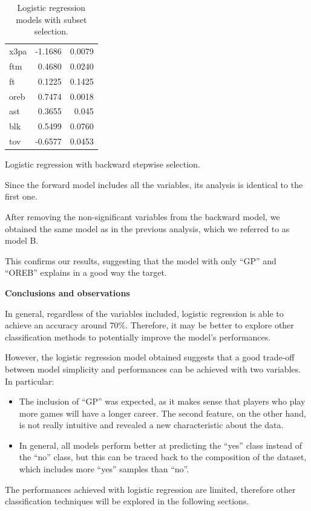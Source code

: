 \begin{table}[H]
\begin{subtable}[h]{0.4\textwidth}
\begin{tabular}{|| l | r | r ||}
			x3pa & -1.1686 & 0.0079 \\
			ftm & 0.4680 & 0.0240 \\
			ft & 0.1225 & 0.1425 \\
			oreb & 0.7474 & 0.0018 \\
			ast & 0.3655 & 0.045 \\
			blk & 0.5499 & 0.0760 \\				
			tov & -0.6577 & 0.0453 \\
			\hline
		\end{tabular}
		\caption{Logistic regression with backward stepwise selection.}
		\label{table:LRBSSum}
	\end{subtable}
	\caption{Logistic regression models with subset selection.}
	\label{table:LRSSum}
\end{table}

Since the forward model includes all the variables, its analysis is identical to the first one.

After removing the non-significant variables from the backward model, we obtained the same model as in the previous analysis, which we referred to as model B. 

This confirms our results, suggesting that the model with only ``GP'' and ``OREB'' explains in a good way the target. 

\vspace{0.2cm}
\textbf{Conclusions and observations}

In general, regardless of the variables included, logistic regression is able to achieve an accuracy around $70\%$. Therefore, it may be better to explore other classification methods to potentially improve the model's performances.

However, the logistic regression model obtained suggests that a good trade-off between model simplicity and performances can be achieved with two variables. In particular:

\begin{itemize}
	\item The inclusion of ``GP'' was expected, as it makes sense that players who play more games will have a longer career. The second feature, on the other hand, is not really intuitive and revealed a new characteristic about the data.
	\item In general, all models perform better at predicting the ``yes'' class instead of the ``no'' class, but this can be traced back to the composition of the dataset, which includes more ``yes'' samples than ``no''.
\end{itemize}

The performances achieved with logistic regression are limited, therefore other classification techniques will be explored in the following sections.
